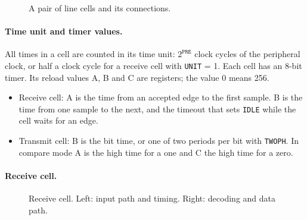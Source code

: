 \documentclass[10pt,a4paper]{article}
\newcommand{\reg}[1]{\texttt{#1}}
\begin{document}
\begin{figure}[H]
\centering
\resizebox{0.84\textwidth}{!}{}
\caption{A pair of line cells and its connections.}
\end{figure}

\paragraph{Time unit and timer values.} All times in a cell are counted in its time unit: $2^{\mathtt{PRE}}$
clock cycles of the peripheral clock, or half a clock cycle for a receive cell with \reg{UNIT} = 1. Each cell has
an 8-bit timer. Its reload values A, B and C are registers; the value 0 means 256.

\begin{itemize}
\item Receive cell: A is the time from an accepted edge to the first sample. B is the time from one sample to
the next, and the timeout that sets \reg{IDLE} while the cell waits for an edge.
\item Transmit cell: B is the bit time, or one of two periods per bit with \reg{TWOPH}. In compare mode A is the
high time for a one and C the high time for a zero.
\end{itemize}

\paragraph{Receive cell.}

\begin{figure}[H]
\centering
\resizebox{\textwidth}{!}{}
\caption{Receive cell. Left: input path and timing. Right: decoding and data path.}
\end{figure}
\end{document}
